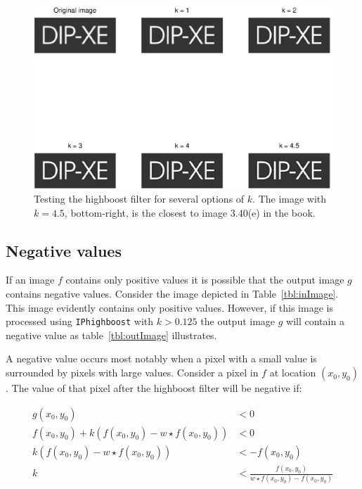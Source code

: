\begin{figure}[ht]
 \centering
 \includegraphics[width=\linewidth]{dipxe.eps}
 \caption{Testing the highboost filter for several options of $k$. The image with $k = 4.5$, bottom-right, is the closest to image 3.40(e) in the book.}
 \label{fig:dipxe}
\end{figure}

\subsection{Negative values}
If an image \(f\) contains only positive values it is possible that the output image \(g\) contains negative values.
Consider the image depicted in Table~\ref{tbl:inImage}.
This image evidently contains only positive values.
However, if this image is processed using \texttt{IPhighboost} with \(k > 0.125\) the output image \(g\) will contain a negative value as table~\ref{tbl:outImage} illustrates.

A negative value occurs most notably when a pixel with a small value is surrounded by pixels with large values.
Consider a pixel in \(f\) at location \(( x_0, y_0 )\).
The value of that pixel after the highboost filter will be negative if:

\begin{equation} \label{zero_pixel}
  \begin{split}
    g(x_0, y_0) &< 0 \\
    f(x_0, y_0) +  k(f(x_0, y_0) - w \star f(x_0, y_0)) &< 0 \\
    k(f(x_0, y_0) - w \star f(x_0, y_0)) &< -f(x_0, y_0) \\
    k &< \frac{f(x_0, y_0)}{w \star f(x_0, y_0) - f(x_0, y_0)}
  \end{split}
\end{equation}

